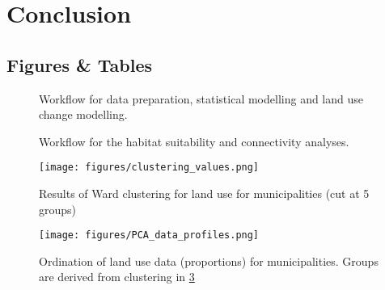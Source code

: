 \section{Conclusion}


\newpage
\begin{center}
\section*{Figures \& Tables}
\end{center}


\begin{figure}[h]
\caption{Workflow for data preparation, statistical modelling and land use change modelling.}
\label{fig:workflow1}
\end{figure}
\clearpage

\begin{figure}[h!]
\caption{Workflow for the habitat suitability and connectivity analyses.} 
\label{fig:workflow2}
\end{figure}
\clearpage


\begin{figure}[h!]
\centering
 \texttt{[image: figures/clustering\_values.png]}
 \caption{Results of Ward clustering for land use for municipalities (cut at 5 groups)}
 \label{fig:clustervals}
\end{figure}

\begin{figure}[h!]
  \centering
    \texttt{[image: figures/PCA\_data\_profiles.png]}
  \caption{Ordination of land use data (proportions) for municipalities. Groups are derived from clustering in \ref{fig:clustervals}}
  \label{fig:PCAvals}
\end{figure}

